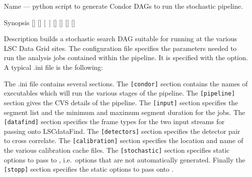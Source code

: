 \begin{entry}
\item[Name]
 --- python script to generate Condor DAGs
to run the stochastic pipeline.

\item[Synopsis]
 \newline \hspace*{0.5in}
[] \newline \hspace*{0.5in}
[] \newline \hspace*{0.5in}
[~] \newline \hspace*{0.5in}
[] \newline \hspace*{0.5in}
[] \newline \hspace*{0.5in}
[] \newline \hspace*{0.5in}
[] \newline \hspace*{0.5in}
~ \newline \hspace*{0.5in}
~

\item[Description]  builds a stochastic
search DAG suitable for running at the various LSC Data Grid sites. The
configuration file specifies the parameters needed to run the analysis
jobs contained within the pipeline. It is specified with the
 option. A typical .ini file is the following:



The .ini file contains several sections. The \verb$[condor]$ section
contains the names of executables which will run the various stages of
the pipeline. The \verb$[pipeline]$ section gives the CVS details of the
pipeline. The \verb$[input]$ section specifies the segment list and the
minimum and maximum segment duration for the jobs. The \verb$[datafind]$
section specifies the frame types for the two input streams for passing
onto LSCdataFind. The \verb$[detectors]$ section specifies the detector
pair to cross correlate. The \verb$[calibration]$ section specifies the
location and name of the various calibration cache files. The
\verb$[stochastic]$ section specifies static options to pass to
, i.e.~options that are not automatically
generated. Finally the \verb$[stopp]$ section specifies the static
options to pass onto .


\end{entry}
